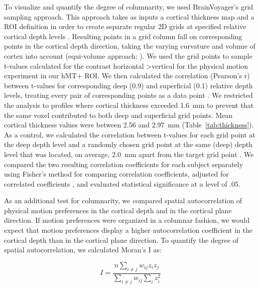 To visualize and quantify the degree of columnarity, we used BrainVoyager's grid sampling approach. This approach takes as inputs a cortical thickness map and a ROI definition in order to create separate regular 2D grids at specified relative cortical depth levels \parencite{Zimmermann2011,Kemper2017}. Resulting points in a grid column fall on corresponding points in the cortical depth direction, taking the varying curvature and volume of cortex into account (equi-volume approach; \cite{Waehnert2014}). We used the grid points to sample t-values calculated for the contrast horizontal \textgreater vertical for the physical motion experiment in our hMT+ ROI. We then calculated the correlation (Pearson's r) between t-values for corresponding deep (0.9) and superficial (0.1) relative depth levels, treating every pair of corresponding points as a data point \parencite{Nasr2016}. We restricted the analysis to profiles where cortical thickness exceeded 1.6~mm to prevent that the same voxel contributed to both deep and superficial grid points. Mean cortical thickness values were between 2.56 and 2.97~mm (Table~\ref{tab:thickness}). As a control, we calculated the correlation between t-values for each grid point at the deep depth level and a randomly chosen grid point at the same (deep) depth level that was located, on average, 2.0~mm apart from the target grid point \parencite{Nasr2016}. We compared the two resulting correlation coefficients for each subject separately using Fisher’s method for comparing correlation coefficients, adjusted for correlated coefficients \parencite{Meng1992}, and evaluated statistical significance at a level of .05.

As an additional test for columnarity, we compared spatial autocorrelation of physical motion preferences in the cortical depth and in the cortical plane direction. If motion preferences were organized in a columnar fashion, we would expect that motion preferences display a higher autocorrelation coefficient in the cortical depth than in the cortical plane direction. To quantify the degree of spatial autocorrelation, we calculated Moran’s I \parencite{Moran1950, Rosenberg2010} as:

\begin{equation}
I = \frac{n \sum\limits_{i \neq j} w_{ij} z_i z_j}{\sum\limits_{i \neq j} w_{ij} \sum\limits_{i} z_i^2}
\end{equation}

